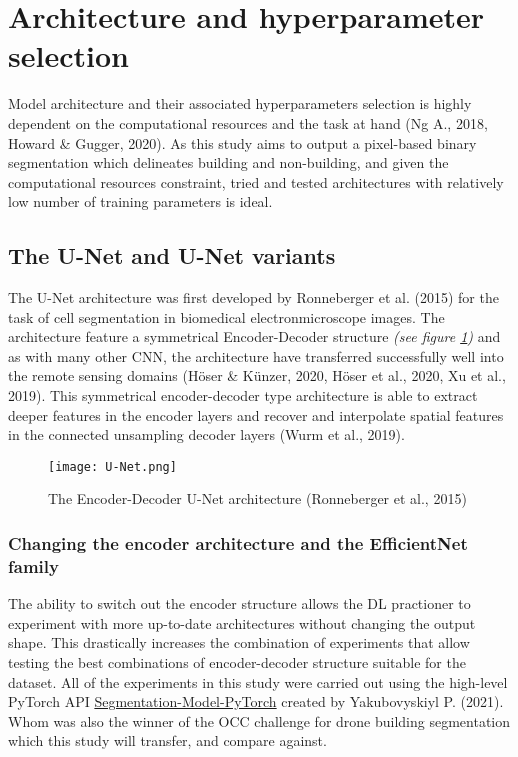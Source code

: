 \documentclass[11pt, a4paper, twoside]{report}
\begin{document}
\section{Architecture and hyperparameter selection}\label{Arch&Hyperparam}

Model architecture and their associated hyperparameters selection is highly dependent on the computational resources and the task at hand (Ng A., 2018, Howard \& Gugger, 2020). As this study aims to output a pixel-based binary segmentation which delineates building and non-building, and given the computational resources constraint, tried and tested architectures with relatively low number of training parameters is ideal.\\\par

\subsection{The U-Net and U-Net variants}\label{Unet}

The U-Net architecture was first developed by Ronneberger et al. (2015) for the task of cell segmentation in biomedical electronmicroscope images. The architecture feature a symmetrical Encoder-Decoder structure \textit{(see figure \ref{fig:U-Net})} and as with many other CNN, the architecture have transferred successfully well into the remote sensing domains (Höser \& Künzer, 2020, Höser et al., 2020, Xu et al., 2019). This symmetrical encoder-decoder type architecture is able to extract deeper features in the encoder layers and recover and interpolate spatial features in the connected unsampling decoder layers (Wurm et al., 2019).\\\par

\begin{figure}[H]
  \centering
  \texttt{[image: U-Net.png]}
  \caption{The Encoder-Decoder U-Net architecture (Ronneberger et al., 2015)}
  \label{fig:U-Net}
\end{figure}

\subsubsection{Changing the encoder architecture and the EfficientNet family}\label{EffNet}

The ability to switch out the encoder structure allows the DL practioner to experiment with more up-to-date architectures without changing the output shape. This drastically increases the combination of experiments that allow testing the best combinations of encoder-decoder structure suitable for the dataset. All of the experiments in this study were carried out using the high-level PyTorch API \href{https://segmentation-models-pytorch.readthedocs.io/en/latest/quickstart.html}{Segmentation-Model-PyTorch} created by Yakubovyskiyl P. (2021). Whom was also the winner of the OCC challenge for drone building segmentation which this study will transfer, and compare against.\\\par
\end{document}
